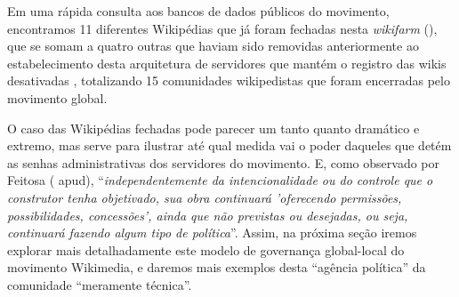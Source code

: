 Em uma rápida consulta aos bancos de dados públicos do movimento, encontramos 11 diferentes Wikipédias que já foram fechadas nesta \textit{wikifarm} (\cite{quarry_close_wikipedias}), que se somam a quatro outras que haviam sido removidas anteriormente ao estabelecimento desta arquitetura de servidores que mantém o registro das wikis desativadas , totalizando 15 comunidades wikipedistas que foram encerradas pelo movimento global.

O caso das Wikipédias fechadas pode parecer um tanto quanto dramático e extremo, mas serve para ilustrar até qual medida vai o poder daqueles que detém as senhas administrativas dos servidores do movimento. E, como observado por Feitosa (\cite[p.5]{latour_cogitamus_2010} apud), ``\textit{independentemente da intencionalidade ou do controle que o construtor tenha objetivado, sua obra continuará 'oferecendo permissões, possibilidades, concessões', ainda que não previstas ou desejadas, ou seja, continuará fazendo algum tipo de política}''. Assim, na próxima seção iremos explorar mais detalhadamente este modelo de governança global-local do movimento Wikimedia, e daremos mais exemplos desta ``agência política'' da comunidade ``meramente técnica''.